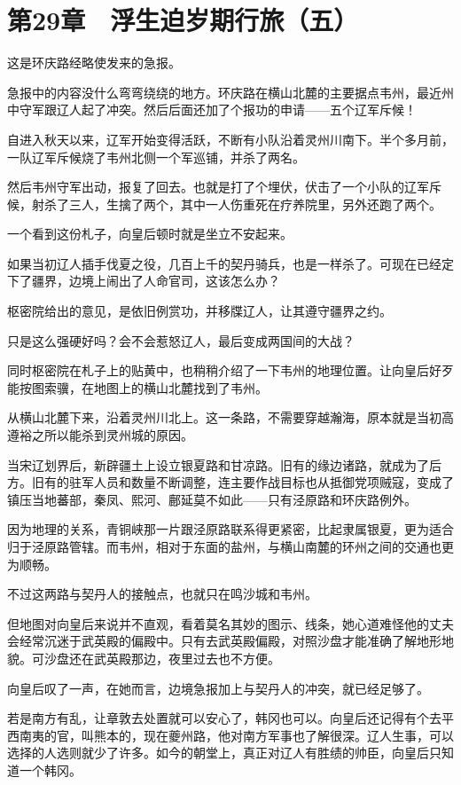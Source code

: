 \section{第29章　浮生迫岁期行旅（五）}

这是环庆路经略使发来的急报。

急报中的内容没什么弯弯绕绕的地方。环庆路在横山北麓的主要据点韦州，最近州中守军跟辽人起了冲突。然后后面还加了个报功的申请——五个辽军斥候！

自进入秋天以来，辽军开始变得活跃，不断有小队沿着灵州川南下。半个多月前，一队辽军斥候烧了韦州北侧一个军巡铺，并杀了两名。

然后韦州守军出动，报复了回去。也就是打了个埋伏，伏击了一个小队的辽军斥候，射杀了三人，生擒了两个，其中一人伤重死在疗养院里，另外还跑了两个。

一个看到这份札子，向皇后顿时就是坐立不安起来。

如果当初辽人插手伐夏之役，几百上千的契丹骑兵，也是一样杀了。可现在已经定下了疆界，边境上闹出了人命官司，这该怎么办？

枢密院给出的意见，是依旧例赏功，并移牒辽人，让其遵守疆界之约。

只是这么强硬好吗？会不会惹怒辽人，最后变成两国间的大战？

同时枢密院在札子上的贴黄中，也稍稍介绍了一下韦州的地理位置。让向皇后好歹能按图索骥，在地图上的横山北麓找到了韦州。

从横山北麓下来，沿着灵州川北上。这一条路，不需要穿越瀚海，原本就是当初高遵裕之所以能杀到灵州城的原因。

当宋辽划界后，新辟疆土上设立银夏路和甘凉路。旧有的缘边诸路，就成为了后方。旧有的驻军人员和数量不断调整，连主要作战目标也从抵御党项贼寇，变成了镇压当地蕃部，秦凤、熙河、鄜延莫不如此——只有泾原路和环庆路例外。

因为地理的关系，青铜峡那一片跟泾原路联系得更紧密，比起隶属银夏，更为适合归于泾原路管辖。而韦州，相对于东面的盐州，与横山南麓的环州之间的交通也更为顺畅。

不过这两路与契丹人的接触点，也就只在鸣沙城和韦州。

但地图对向皇后来说并不直观，看着莫名其妙的图示、线条，她心道难怪他的丈夫会经常沉迷于武英殿的偏殿中。只有去武英殿偏殿，对照沙盘才能准确了解地形地貌。可沙盘还在武英殿那边，夜里过去也不方便。

向皇后叹了一声，在她而言，边境急报加上与契丹人的冲突，就已经足够了。

若是南方有乱，让章敦去处置就可以安心了，韩冈也可以。向皇后还记得有个去平西南夷的官，叫熊本的，现在夔州路，他对南方军事也了解很深。辽人生事，可以选择的人选则就少了许多。如今的朝堂上，真正对辽人有胜绩的帅臣，向皇后只知道一个韩冈。

